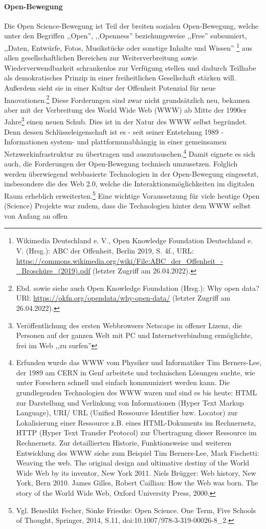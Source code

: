 \paragraph{Open-Bewegung} Die Open Science-Bewegung ist Teil der breiten sozialen Open-Bewegung, welche unter den Begriffen ,,Open'', ,,Openness'' beziehungsweise ,,Free'' subsumiert, ,,Daten, Entwürfe, Fotos, Musikstücke oder sonstige Inhalte und Wissen'' \footnote{Wikimedia Deutschland e. V., Open Knowledge Foundation Deutschland e. V. (Hrsg.): ABC der Offenheit, Berlin 2019, S. 4f., URL: \url{https://commons.wikimedia.org/wiki/File:ABC_der_Offenheit_-_Broschüre_(2019).pdf} (letzter Zugriff am 26.04.2022).} aus allen gesellschaftlichen Bereichen zur Weiterverbreitung sowie Wiederverwendbarkeit schrankenlos zur Verfügung stellen und dadurch Teilhabe als demokratisches Prinzip in einer freiheitlichen Gesellschaft stärken will. Außerdem sieht sie in einer Kultur der Offenheit Potenzial für neue Innovationen.\footnote{Ebd. sowie siehe auch Open Knowledge Foundation (Hrsg.): Why open data? URl: \url{https://okfn.org/opendata/why-open-data/} (letzter Zugriff am 26.04.2022).} Diese Forderungen sind zwar nicht grundsätzlich neu, bekamen aber mit der Verbreitung des World Wide Web (WWW) ab Mitte der 1990er Jahre\footnote{Veröffentlichung des ersten Webbrowsers Netscape in offener Lizenz, die Personen auf der ganzen Welt mit PC und Internetverbindung ermöglichte, frei im Web ,,zu surfen''} einen neuen Schub. Dies ist in der Natur des WWW selbst begründet. Denn dessen Schlüsseleigenschaft ist es - seit seiner Entstehung 1989 - Informationen system- und plattformunabhängig in einer gemeinsamen Netzwerkinfrastruktur zu übertragen und auszutauschen.\footnote{Erfunden wurde das WWW vom Physiker und Informatiker Tim Berners-Lee, der 1989 am CERN in Genf arbeitete und technischen Lösungen suchte, wie unter Forschern schnell und einfach kommuniziert werden kann. Die grundlegenden Technologien des WWW waren und sind es bis heute: HTML zur Darstellung und Verlinkung von Informationen (Hyper Text Markup Language), URI/ URL (Unified Ressource Identifier bzw. Locator) zur Lokalisierung einer Ressource z.B. eines HTML-Dokuments im Rechnernetz, HTTP (Hyper Text Transfer Protocol) zur Übertragung dieser Ressource im Rechnernetz. Zur detaillierten Historie, Funktionsweise und weiteren Entwicklung des WWW siehe zum Beispiel Tim Berners-Lee, Mark Fischetti: Weaving the web. The original design and ultimative destiny of the World Wide Web by its inventor, New York 2011. Niels Brügger: Web history, New York, Bern 2010. James Gilles, Robert Cailliau: How the Web was born. The story of the World Wide Web, Oxford University Press, 2000.} Damit eignete es sich auch, die Forderungen der Open-Bewegung technisch umzusetzen. Folglich werden überwiegend webbasierte Technologien in der Open-Bewegung eingesetzt, insbesondere die des Web 2.0, welche die Interaktionsmöglichkeiten im digitalen Raum erheblich erweiterten.\footnote{Vgl. Benedikt Fecher, Sönke Friesike: Open Science. One Term, Five Schools of Thought, Springer, 2014, S.11, doi:10.1007/978-3-319-00026-8\_2.} Eine wichtige Voraussetzung für viele heutige Open (Science) Projekte war zudem, dass die Technologien hinter dem WWW selbst von Anfang an offen 